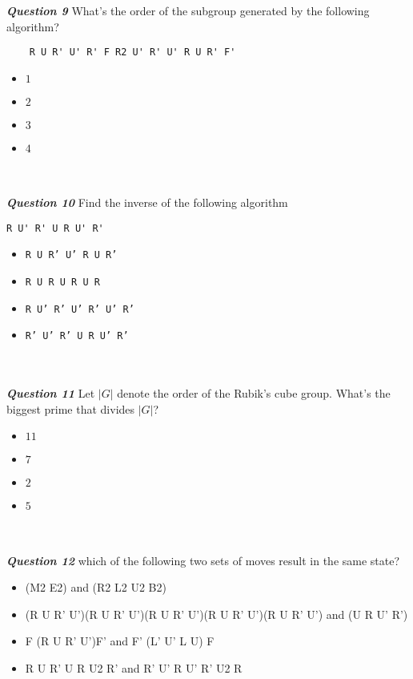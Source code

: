 \documentclass{article}
\begin{document}
\\\\
\textbf{\textit{Question 9}} What's the order of the subgroup generated by the following algorithm?
\begin{verbatim}
    R U R' U' R' F R2 U' R' U' R U R' F'
\end{verbatim}
\begin{itemize}
    \item $1$
    \item $2$
    \item $3$
    \item $4$
\end{itemize}
\\\\
\textbf{\textit{Question 10}}
\question Find the inverse of the following algorithm
\begin{verbatim}
R U' R' U R U' R'
\end{verbatim}

\begin{itemize}
    \item \texttt{R U R' U' R U R'}
    \item \texttt{R U R U R U R}
    \item \texttt{R U' R' U' R' U' R'}
    \item \texttt{R' U' R' U R U' R'}
\end{itemize}
\\\\
\textbf{\textit{Question 11}}
\question Let $|G|$ denote the order of the Rubik's cube group. What's the biggest prime that divides $|G|$? \\
\begin{itemize}
    \item $11$
    \item $7$
    \item $2$
    \item $5$
\end{itemize}
\\\\
\textbf{\textit{Question 12}}
which of the following two sets of moves result in the same state?
\begin{itemize}
    \item (M2 E2) and (R2 L2 U2 B2)
    \item (R U R' U')(R U R' U')(R U R' U')(R U R' U')(R U R' U') and (U R U' R')
    \item F (R U R' U')F' and F' (L' U' L U) F
    \item R U R' U R U2 R' and R' U' R U' R' U2 R
\end{itemize}
\end{document}
